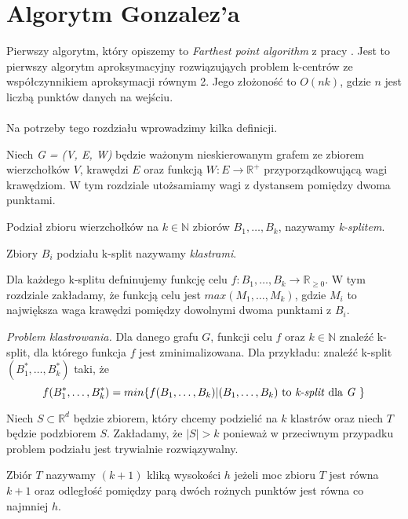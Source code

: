 \section{Algorytm Gonzalez'a}

Pierwszy algorytm, który opiszemy to \textit{Farthest point algorithm} z pracy \cite{Gonzalez1985ClusteringTM}.
Jest to pierwszy algorytm aproksymacyjny rozwiązująych problem k-centrów ze współczynnikiem aproksymacji równym 2.
Jego złożoność to $O(nk)$, gdzie $n$ jest liczbą punktów danych na wejściu. 
\\~\\
Na potrzeby tego rozdziału wprowadzimy kilka definicji.

\begin{definition}
    Niech \emph{G = (V, E, W)} będzie ważonym nieskierowanym grafem ze zbiorem wierzchołków $V$, krawędzi $E$ oraz funkcją $W: E \rightarrow \mathbb{R}^{+}$ przyporządkowującą wagi krawędziom. 
    W tym rozdziale utożsamiamy wagi z dystansem pomiędzy dwoma punktami. 
\end{definition}

\begin{definition}
    Podział zbioru wierzchołków na $k \in \mathbb{N}$ zbiorów $B_{1},\dots,B_{k}$, nazywamy \emph{k-splitem}.
\end{definition}

\begin{definition}
    Zbiory $B_{i}$ podziału k-split nazywamy \emph{klastrami}.
\end{definition}

\noindent
Dla każdego k-splitu defninujemy funkcję celu $f: B_{1},\dots,B_{k} \rightarrow \mathbb{R}_{\geq0}$.
W tym rozdziale zakładamy, że funkcją celu jest $max(M_{1},\dots,M_{k})$, gdzie $M_{i}$ to największa waga krawędzi pomiędzy dowolnymi dwoma punktami z $B_{i}$.

\begin{definition}
    \emph{Problem klastrowania.} Dla danego grafu $G$, funkcji celu $f$ oraz $k \in \mathbb{N}$ znaleźć k-split, dla którego funkcja $f$ jest zminimalizowana.
    Dla przykładu: znaleźć k-split $(B_{1}^{*},\dots,B_{k}^{*})$ taki, że 
    \begin{equation}
        f(B_{1}^{*},\dots,B_{k}^{*}) = min\{ f(B_{1},\dots,B_{k}) | (B_{1},\dots,B_{k}) \text{ to \textit{k-split} dla \textit{G} } \}
    \end{equation}
\end{definition}

\noindent
Niech $S \subset \mathbb{R}^{d}$ będzie zbiorem, który chcemy podzielić na $k$ klastrów oraz niech $T$ będzie podzbiorem $S$.
Zakładamy, że $|S| > k$ ponieważ w przeciwnym przypadku problem podziału jest trywialnie rozwiązywalny.
\begin{definition}
Zbiór $T$ nazywamy $(k+1)$ kliką wysokości $h$ jeżeli moc zbioru $T$ jest równa $k+1$ oraz odległość pomiędzy parą dwóch rożnych punktów jest równa co najmniej $h$. 
\end{definition}

